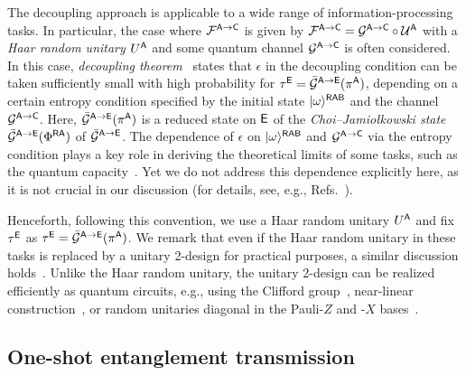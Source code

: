 The decoupling approach is applicable to a wide range of information-processing tasks.
In particular, the case where ${\mathcal{F}}^{{\mathsf{A}}\rightarrow{\mathsf{C}}}$ is given by ${\mathcal{F}}^{{\mathsf{A}}\rightarrow{\mathsf{C}}} = {\mathcal{G}}^{{\mathsf{A}}\rightarrow{\mathsf{C}}} \circ {\mathcal{U}}^{\mathsf{A}}$ with a \emph{Haar random unitary} $U^{\mathsf{A}}$ and some quantum channel ${\mathcal{G}}^{{\mathsf{A}}\rightarrow{\mathsf{C}}}$ is often considered.
In this case, \emph{decoupling theorem}~\cite{dupuis2014one} states that $\epsilon$ in the decoupling condition can be taken sufficiently small with high probability for $\tau^{\mathsf{E}} = \bar{{\mathcal{G}}}^{{\mathsf{A}}\rightarrow{\mathsf{E}}}(\pi^{\mathsf{A}})$, depending on a certain entropy condition specified by the initial state $|\omega\rangle^{{\mathsf{R}}{\mathsf{A}}{\mathsf{B}}}$ and the channel ${\mathcal{G}}^{{\mathsf{A}}\rightarrow{\mathsf{C}}}$.
Here, $\bar{{\mathcal{G}}}^{{\mathsf{A}}\rightarrow{\mathsf{E}}}(\pi^{\mathsf{A}})$ is a reduced state on ${\mathsf{E}}$ of the \emph{Choi–Jamio\l kowski state} $\bar{{\mathcal{G}}}^{{\mathsf{A}}\rightarrow{\mathsf{E}}}(\Phi^{{\mathsf{R}}{\mathsf{A}}})$ of $\bar{{\mathcal{G}}}^{{\mathsf{A}}\rightarrow{\mathsf{E}}}$.
The dependence of $\epsilon$ on $|\omega\rangle^{{\mathsf{R}}{\mathsf{A}}{\mathsf{B}}}$ and ${\mathcal{G}}^{{\mathsf{A}}\rightarrow{\mathsf{C}}}$ via the entropy condition plays a key role in deriving the theoretical limits of some tasks, such as the quantum capacity~\cite{hayden2008decoupling}.
Yet we do not address this dependence explicitly here, as it is not crucial in our discussion (for details, see, e.g., Refs.~\cite{dupuis2010decoupling, dupuis2014one, khatri2024principlemodern}).




Henceforth, following this convention, we use a Haar random unitary $U^{\mathsf{A}}$ and fix $\tau^{\mathsf{E}}$ as $\tau^{\mathsf{E}} = \bar{{\mathcal{G}}}^{{\mathsf{A}}\rightarrow{\mathsf{E}}}(\pi^{\mathsf{A}})$.
We remark that even if the Haar random unitary in these tasks is replaced by a unitary 2-design for practical purposes, a similar discussion holds~\cite{Szehr2013decouple2design}.
Unlike the Haar random unitary, the unitary 2-design can be realized efficiently as quantum circuits, e.g., using the Clifford group~\cite{DiVincenzoQdatahiding}, near-linear construction~\cite{cleve2016nearlinearexact2design}, or random unitaries diagonal in the Pauli-$Z$ and -$X$ bases~\cite{Nakata2017randomdiagonal2design}.











\subsection{One-shot entanglement transmission}
\label{sec:qi transmission}





